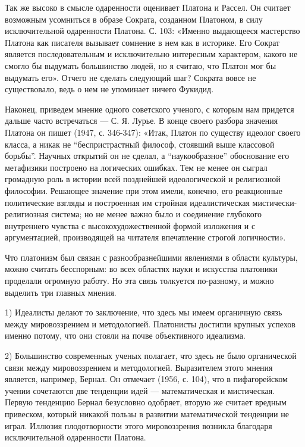 Так же высоко в смысле одаренности оценивает Платона и Рассел. Он
считает возможным усомниться в образе Сократа, созданном Платоном, в
силу исключительной одаренности Платона. С. 103: «Именно выдающееся
мастерство Платона как писателя вызывает сомнение в нем как в
историке. Его Сократ является последовательным и исключительно
интересным характером, какого не смогло бы выдумать большинство людей,
но я считаю, что Платон мог бы выдумать его». Отчего не сделать
следующий шаг? Сократа вовсе не существовало, ведь о нем не упоминает
ничего Фукидид.

Наконец, приведем мнение одного советского ученого, с которым нам
придется дальше часто встречаться --- С. Я. Лурье. В конце своего
разбора значения Платона он пишет (1947, с. 346-347): «Итак, Платон по
существу идеолог своего класса, а никак не ``беспристрастный философ,
стоявший выше классовой борьбы''. Научных открытий он не сделал, а
``наукообразное'' обоснование его метафизики построено на логических
ошибках. Тем не менее он сыграл громадную роль в истории всей
позднейшей идеологической и религиозной философии. Решающее значение
при этом имели, конечно, его реакционные политические взгляды и
построенная им стройная идеалистическая мистически-религиозная
система; но не менее важно было и соединение глубокого внутреннего
чувства с высокохудожественной формой изложения и с аргументацией,
производящей на читателя впечатление строгой логичности».

Что платонизм был связан с разнообразнейшими явлениями в области
культуры, можно считать бесспорным: во всех областях науки и искусства
платоники проделали огромную работу. Но эта связь толкуется
по-разному, и можно выделить три главных мнения.

1) Идеалисты делают то заключение, что здесь мы имеем органичную связь
между мировоззрением и методологией. Платонисты достигли крупных
успехов именно потому, что они стояли на почве объективного идеализма.

2) Большинство современных ученых полагает, что здесь не было
органической связи между мировоззрением и методологией. Выразителем
этого мнения является, например, Бернал. Он отмечает (1956, с. 104),
что в пифагорейском учении сочетаются две тенденции идей ---
математическая и мистическая. Первую тенденцию Бернал безусловно
одобряет, вторую же считает вредным привеском, который никакой пользы
в развитии математической тенденции не играл. Иллюзия плодотворности
этого мировоззрения возникла благодаря исключительной одаренности
Платона.

